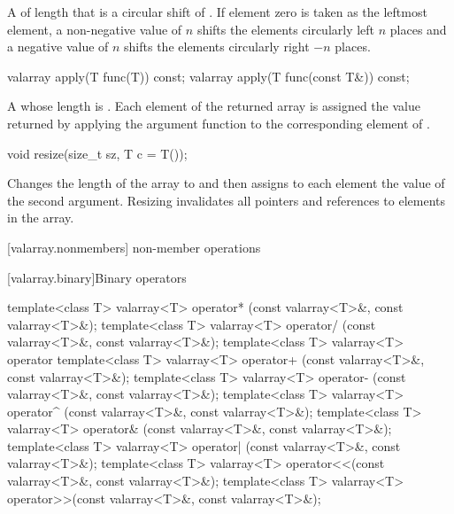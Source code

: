 \begin{itemdescr}
\pnum
\returns
A  of length 
that is a circular shift of . If element zero is taken as
the leftmost element, a non-negative value of $n$ shifts
the elements circularly left $n$ places and a negative
value of $n$ shifts the elements circularly right $-n$ places.
\end{itemdescr}

%
\begin{itemdecl}
valarray apply(T func(T)) const;
valarray apply(T func(const T&)) const;
\end{itemdecl}

\begin{itemdescr}
\pnum
\returns
A  whose length is .
Each element of the returned array is assigned
the value returned by applying the argument function to the
corresponding element of .
\end{itemdescr}

%
\begin{itemdecl}
void resize(size_t sz, T c = T());
\end{itemdecl}

\begin{itemdescr}
\pnum
\effects
Changes the length of the  array to 
and then assigns to each element the value of the second argument.
Resizing invalidates all pointers and references to elements in the array.
\end{itemdescr}

[valarray.nonmembers]{ non-member operations}

[valarray.binary]{Binary operators}

%
%
%
%
%
%
%
%
%
%
\begin{itemdecl}
template<class T> valarray<T> operator* (const valarray<T>&, const valarray<T>&);
template<class T> valarray<T> operator/ (const valarray<T>&, const valarray<T>&);
template<class T> valarray<T> operator%
template<class T> valarray<T> operator+ (const valarray<T>&, const valarray<T>&);
template<class T> valarray<T> operator- (const valarray<T>&, const valarray<T>&);
template<class T> valarray<T> operator^ (const valarray<T>&, const valarray<T>&);
template<class T> valarray<T> operator& (const valarray<T>&, const valarray<T>&);
template<class T> valarray<T> operator| (const valarray<T>&, const valarray<T>&);
template<class T> valarray<T> operator<<(const valarray<T>&, const valarray<T>&);
template<class T> valarray<T> operator>>(const valarray<T>&, const valarray<T>&);
\end{itemdecl}

